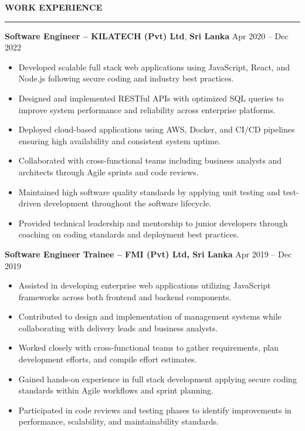 \documentclass[10pt,letterpaper]{article}
\begin{document}
\textbf{WORK EXPERIENCE}\\[-8pt]
\noindent\rule{\textwidth}{1pt}

\vspace{-2pt}

\textbf{Software Engineer -- KILATECH (Pvt) Ltd}, \textbf{Sri Lanka} \hfill Apr 2020 -- Dec 2022

\vspace{-1pt}

\begin{itemize}
\item Developed scalable full stack web applications using JavaScript, React, and Node.js following secure coding and industry best practices.
\item Designed and implemented RESTful APIs with optimized SQL queries to improve system performance and reliability across enterprise platforms.
\item Deployed cloud-based applications using AWS, Docker, and CI/CD pipelines ensuring high availability and consistent system uptime.
\item Collaborated with cross-functional teams including business analysts and architects through Agile sprints and code reviews.
\item Maintained high software quality standards by applying unit testing and test-driven development throughout the software lifecycle.
\item Provided technical leadership and mentorship to junior developers through coaching on coding standards and deployment best practices.
\end{itemize}

\textbf{Software Engineer Trainee -- FMI (Pvt) Ltd, Sri Lanka} \hfill Apr 2019 -- Dec 2019

\vspace{-1pt}

\begin{itemize}
\item Assisted in developing enterprise web applications utilizing JavaScript frameworks across both frontend and backend components.
\item Contributed to design and implementation of management systems while collaborating with delivery leads and business analysts.
\item Worked closely with cross-functional teams to gather requirements, plan development efforts, and compile effort estimates.
\item Gained hands-on experience in full stack development applying secure coding standards within Agile workflows and sprint planning.
\item Participated in code reviews and testing phases to identify improvements in performance, scalability, and maintainability standards.
\end{itemize}
\end{document}
